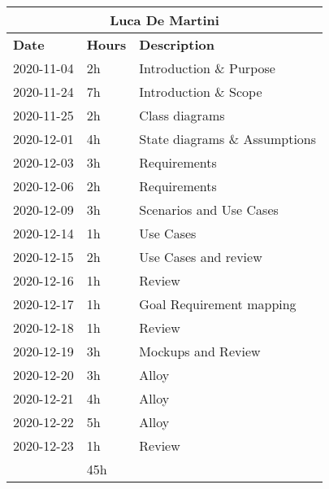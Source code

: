 
\begin{table}[H]
    \centering
    \begin{tabular}{|l|l|l|}
        \multicolumn{3}{c}{\textbf{Luca De Martini}}                   \\
        \hline
        \textbf{Date} & \textbf{Hours} & \textbf{Description}          \\\hline
        2020-11-04    & 2h             & Introduction \& Purpose       \\\hline
        2020-11-24    & 7h             & Introduction \& Scope         \\\hline
        2020-11-25    & 2h             & Class diagrams                \\\hline
        2020-12-01    & 4h             & State diagrams \& Assumptions \\\hline
        2020-12-03    & 3h             & Requirements                  \\\hline
        2020-12-06    & 2h             & Requirements                  \\\hline
        2020-12-09    & 3h             & Scenarios and Use Cases       \\\hline
        2020-12-14    & 1h             & Use Cases                     \\\hline
        2020-12-15    & 2h             & Use Cases and review          \\\hline
        2020-12-16    & 1h             & Review                        \\\hline
        2020-12-17    & 1h             & Goal Requirement mapping      \\\hline
        2020-12-18    & 1h             & Review                        \\\hline
        2020-12-19    & 3h             & Mockups and Review            \\\hline
        2020-12-20    & 3h             & Alloy                         \\\hline
        2020-12-21    & 4h             & Alloy                         \\\hline
        2020-12-22    & 5h             & Alloy                         \\\hline
        2020-12-23    & 1h             & Review                        \\\hline\hline
                      & 45h            &                               \\\hline
    \end{tabular}
\end{table}
